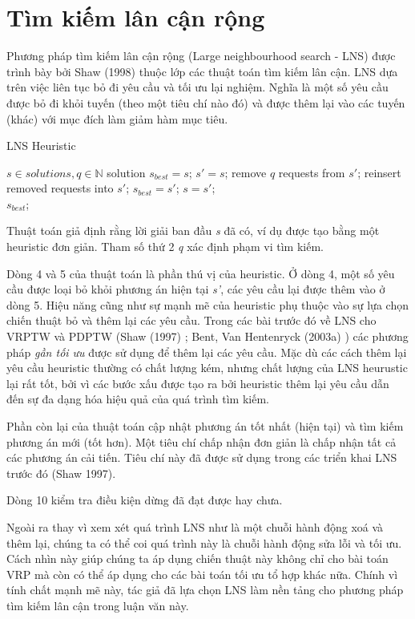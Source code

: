 \section{Tìm kiếm lân cận rộng}
Phương pháp tìm kiếm lân cận rộng (Large neighbourhood search - LNS) được trình bày bởi Shaw (1998) \cite{shaw1998using} thuộc lớp các thuật toán tìm kiếm lân cận. LNS dựa trên việc liên tục bỏ đi yêu cầu và tối ưu lại nghiệm. Nghĩa là một số yêu cầu được bỏ đi khỏi tuyến (theo một tiêu chí nào đó) và được thêm lại vào các tuyến (khác) với mục đích làm giảm hàm mục tiêu.

\begin{algorithm}
  \label{alg:lns}
	\caption{LNS Heuristic} 
	\begin{algorithmic}[1]
        \Require $s \in {solutions}, q \in \mathbb{N}$
        \State solution $s_{best} = s$;
				\Repeat
					\State $s'=s$;
					\State remove $q$ requests from $s'$;
					\State reinsert removed requests into $s'$;
						\State $s_{best} = s'$;
					\EndIf
						\State $s=s'$;
					\EndIf
				\\
				\Return $s_{best}$;
	\end{algorithmic} 
\end{algorithm}

Thuật toán giả định rằng lời giải ban đầu \textit{s} đã có, ví dụ được tạo bằng một heuristic đơn giản. Tham số thứ 2 \textit{q} xác định phạm vi tìm kiếm. 

Dòng 4 và 5 của thuật toán là phần thú vị của heuristic. Ở dòng 4, một số yêu cầu được loại bỏ khỏi phương án hiện tại \textit{s'}, các yêu cầu lại được thêm vào ở dòng 5. Hiệu năng cũng như sự mạnh mẽ của heuristic phụ thuộc vào sự lựa chọn chiến thuật bỏ và thêm lại các yêu cầu. Trong các bài trước đó về LNS cho VRPTW và PDPTW (Shaw (1997) \cite{}; Bent, Van Hentenryck (2003a) \cite{}) các phương pháp \textit{gần tối ưu} được sử dụng để thêm lại các yêu cầu. Mặc dù các cách thêm lại yêu cầu heuristic thường có chất lượng kém, nhưng chất lượng của LNS heurustic lại rất tốt, bởi vì các bước xấu được tạo ra bởi heuristic thêm lại yêu cầu dẫn đến sự đa dạng hóa hiệu quả của quá trình tìm kiếm. 

Phần còn lại của thuật toán cập nhật phương án tốt nhất (hiện tại) và tìm kiếm phương án mới (tốt hơn). Một tiêu chí chấp nhận đơn giản là chấp nhận tất cả các phương án cải tiến. Tiêu chí này đã được sử dụng trong các triển khai LNS trước đó (Shaw 1997).

Dòng 10 kiểm tra điều kiện dừng đã đạt được hay chưa.

Ngoài ra thay vì xem xét quá trình LNS như là một chuỗi hành động xoá và thêm lại, chúng ta có thể coi quá trình này là chuỗi hành động sửa lỗi và tối ưu. Cách nhìn này giúp chúng ta áp dụng chiến thuật này không chỉ cho bài toán VRP mà còn có thể áp dụng cho các bài toán tối ưu tổ hợp khác nữa. Chính vì tính chất mạnh mẽ này, tác giả đã lựa chọn LNS làm nền tảng cho phương pháp tìm kiếm lân cận trong luận văn này.